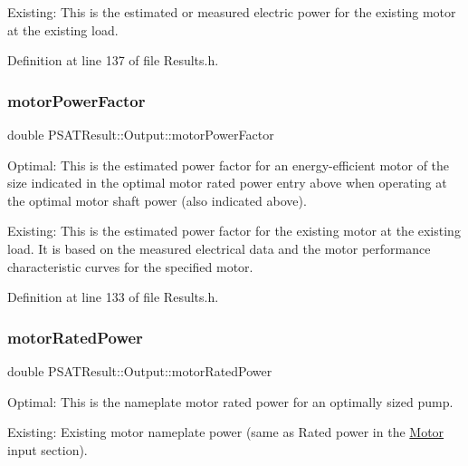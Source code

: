 Existing\+: This is the estimated or measured electric power for the existing motor at the existing load. 

Definition at line 137 of file Results.\+h.

\mbox{\label{struct_p_s_a_t_result_1_1_output_a4e99d794b66677cc0329f47a100d251a}} 
\subsubsection{\texorpdfstring{motor\+Power\+Factor}{motorPowerFactor}}
{\footnotesize\ttfamily double P\+S\+A\+T\+Result\+::\+Output\+::motor\+Power\+Factor}



Optimal\+: This is the estimated power factor for an energy-\/efficient motor of the size indicated in the optimal motor rated power entry above when operating at the optimal motor shaft power (also indicated above). 

Existing\+: This is the estimated power factor for the existing motor at the existing load. It is based on the measured electrical data and the motor performance characteristic curves for the specified motor. 

Definition at line 133 of file Results.\+h.

\mbox{\label{struct_p_s_a_t_result_1_1_output_a72f4e093c7cd3ee1ea943cebd79c2d7a}} 
\subsubsection{\texorpdfstring{motor\+Rated\+Power}{motorRatedPower}}
{\footnotesize\ttfamily double P\+S\+A\+T\+Result\+::\+Output\+::motor\+Rated\+Power}



Optimal\+: This is the nameplate motor rated power for an optimally sized pump. 

Existing\+: Existing motor nameplate power (same as Rated power in the \hyperlink{struct_motor}{Motor} input section). 

